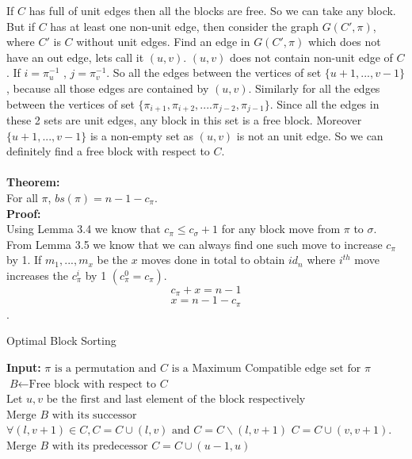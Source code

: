 \documentclass[BTech]{iitmdiss}
\begin{document}
If $C$ has full of unit edges then all the blocks are free. So we can take any block. But if $C$ has at least one non-unit edge, then consider the graph $G(C',\pi)$, where $C'$ is $C$ without unit edges. Find an edge in $G(C',\pi)$ which does not have an out edge, lets call it $(u,v)$. $(u,v)$ does not contain non-unit edge of $C$. If $i = \pi^{-1}_u$ , $j = \pi^{-1}_v$. So all the edges between the vertices of set $\{u+1,...,v-1\}$, because all those edges are contained by $(u,v)$. Similarly for all the edges between the vertices of set $\{\pi_{i+1},\pi_{i+2},....\pi_{j-2},\pi_{j-1}\}$. Since all the edges in these 2 sets are unit edges, any block in this set is a free block. Moreover $\{u+1,...,v-1\}$ is a non-empty set as $(u,v)$ is not an unit edge. So we can definitely find a free block with respect to $C$.\\~\\
\textbf{Theorem:}\\
For all $\pi$, $bs(\pi) = n-1-c_{\pi}$.\\
\textbf{Proof:}\\
Using Lemma 3.4 we know that $c_\pi \leq c_\sigma + 1$ for any block move from $\pi$ to $\sigma$. From Lemma 3.5 we know that we can always find one such move to increase $c_{\pi}$ by 1. If $m_1,...,m_x$ be the $x$ moves done in total to obtain $id_n$ where $i^{th}$ move increases the $c^i_{\pi}$ by 1 $(c^0_{\pi} = c_{\pi})$.  $$c_{\pi} + x = n-1$$ $$x = n-1-c_{\pi}$$. 


\begin{algorithm}
\caption{Optimal Block Sorting}\label{euclid}
\begin{algorithmic}[1]
\State \textbf{Input: } $\pi \text{ is a permutation and }\textit{C} \text{ is a Maximum Compatible edge set for } \pi$ 
\State $\textit{B} \gets \text{Free block with respect to }\textit{C}$
\State $\text{Let } u,v \text{ be the first and last element of the block respectively}$
\State $\text{Merge } \textit{B} \text{ with its successor}$
\State $\forall (l,v+1) \in C, C = C\cup(l,v) \text{ and } C=C\backslash(l,v+1) $
\State $C = C\cup(v,v+1)$.
\Else
\State $\text{Merge } \textit{B} \text{ with its predecessor}$
\State $C = C\cup(u-1,u)$
\EndIf
\EndWhile
\EndProcedure
\end{algorithmic}
\end{algorithm}

\end{document}
